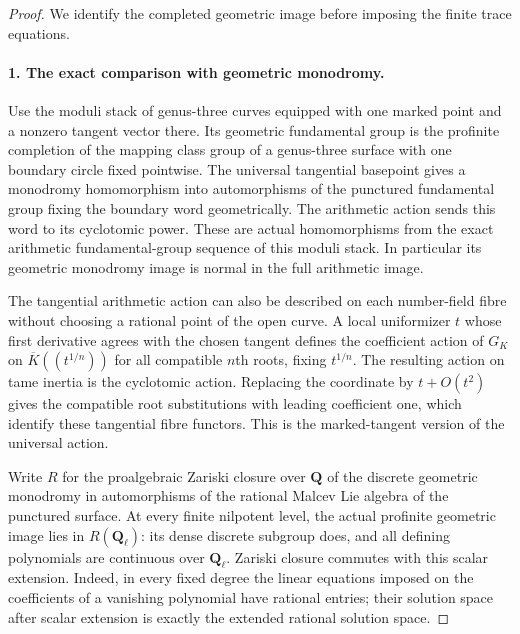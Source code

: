 \begin{proof}
We identify the completed geometric image before imposing the finite trace equations.
\paragraph{1. The exact comparison with geometric monodromy.}
Use the moduli stack of genus-three curves equipped with
one marked point and a nonzero tangent vector there.
Its geometric fundamental group is the profinite
completion of the mapping class group of a genus-three
surface with one boundary circle fixed pointwise.
The universal tangential basepoint gives a monodromy
homomorphism into automorphisms of the punctured
fundamental group fixing the boundary word geometrically.
The arithmetic action sends this word to its cyclotomic
power. These are actual homomorphisms from the exact
arithmetic fundamental-group sequence of this moduli stack.
In particular its geometric monodromy image is normal
in the full arithmetic image.

The tangential arithmetic action can also be described
on each number-field fibre without choosing a rational
point of the open curve. A local uniformizer $t$ whose
first derivative agrees with the chosen tangent defines
the coefficient action of $G_K$ on
$\overline K((t^{1/n}))$ for all compatible $n$th roots,
fixing $t^{1/n}$. The resulting action on tame inertia
is the cyclotomic action. Replacing the coordinate by
$t+O(t^2)$ gives the compatible root substitutions with
leading coefficient one, which identify these tangential
fibre functors. This is the marked-tangent version of
the universal action.

Write $R$ for the proalgebraic Zariski closure over
$\mathbf Q$ of the discrete geometric monodromy in
automorphisms of the rational Malcev Lie algebra of
the punctured surface. At every finite nilpotent level,
the actual profinite geometric image lies in
$R(\mathbf Q_\ell)$: its dense discrete subgroup does,
and all defining polynomials are continuous over
$\mathbf Q_\ell$. Zariski closure commutes with this
scalar extension. Indeed, in every fixed degree the
linear equations imposed on the coefficients of a
vanishing polynomial have rational entries; their
solution space after scalar extension is exactly the
extended rational solution space.


\end{proof}
